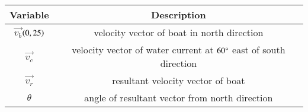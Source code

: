 \begin{tabular}[12pt]{ |c| c| }
    \hline
	\textbf{Variable}  & \textbf{Description}  \\
    \hline
	$\vec{v_b}$$\left(0,25\right)$ & velocity vector of boat in north direction \\
    \hline 
	$\vec{v_c}$ & velocity vector of water current at $60\degree$ east of south direction \\
    \hline
	$\vec{v_r}$& resultant velocity vector of boat  \\  
    \hline 
        $\theta$ & angle of resultant vector from north direction \\
    \hline    
            
\end{tabular}
